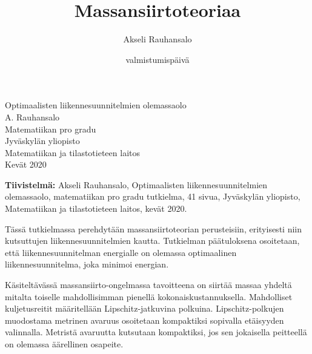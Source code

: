 
\title{Massansiirtoteoriaa}
\author{Akseli Rauhansalo}
\date{valmistumispäivä}


\thispagestyle{empty}                   %
\begin{center}                          %
\null\vspace{3cm}                       %
\Large                                  %
Optimaalisten liikennesuunnitelmien olemassaolo \\[2cm]                     %
\large                                  %
A. Rauhansalo\\[1cm]                    %
\vfill                                  %
\normalsize                             %
Matematiikan pro gradu\\[1cm]           %
Jyväskylän yliopisto\\                  %
Matematiikan ja tilastotieteen laitos\\ %
Kevät 2020                              %
\end{center}                            %
\frontmatter

\noindent
\textbf{Tiivistelmä:} Akseli Rauhansalo, Optimaalisten liikennesuunnitelmien olemassaolo, matematiikan pro gradu tutkielma, 41 sivua, Jyväskylän yliopisto, Matematiikan ja tilastotieteen laitos, kevät 2020.

\vspace{1pc}
Tässä tutkielmassa perehdytään massansiirtoteorian perusteisiin, erityisesti niin kutsuttujen liikennesuunnitelmien kautta. Tutkielman päätuloksena osoitetaan, että liikennesuunnitelman energialle on olemassa optimaalinen liikennesuunnitelma, joka minimoi energian. 

Käsiteltävässä massansiirto-ongelmassa tavoitteena on siirtää massaa yhdeltä mitalta toiselle mahdollisimman pienellä kokonaiskustannuksella. Mahdolliset kuljetusreitit määritellään Lipschitz-jatkuvina polkuina. Lipschitz-polkujen muodostama metrinen avaruus osoitetaan kompaktiksi sopivalla etäisyyden valinnalla. Metristä avaruutta kutsutaan kompaktiksi, jos sen jokaisella peitteellä on olemassa äärellinen osapeite. 

